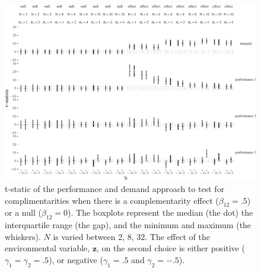 \documentclass[12pt]{article}
\begin{document}
\begin{figure}

\includegraphics[width=500px]{figure-latex/unnamed-chunk-7-1}
\caption[Error Rate and Power with Increasing Levels of Variability in Performance]
{\label{noise} t-static of the performance and demand approach to test
for complimentarities when there is a complementarity effect ($\beta_{12} = .5$)
or a null ($\beta_{12} = 0$). The boxplots represent the median (the dot) the
interquartile range (the gap), and the minimum and maximum (the whiskers). $N$
is varied between 2, 8, 32. The effect of the environmental
variable, $\mathbf{z}$, on the second choice is either positive
($\gamma_1 = \gamma_2 = .5$), or
negative ($\gamma_1 = .5$ and $\gamma_2 = -.5$).}
\end{figure}
\end{document}
